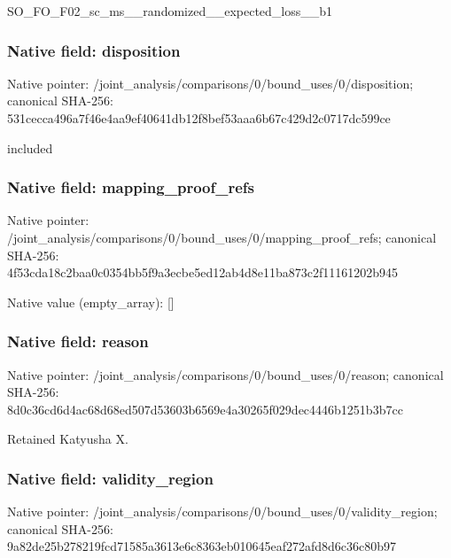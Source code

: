 \documentclass[10pt,a4paper]{article}
\begin{document}
\begingroup\raggedright\sloppy SO\_\allowbreak{}FO\_\allowbreak{}F02\_\allowbreak{}sc\_\allowbreak{}ms\_\allowbreak{}\_\allowbreak{}randomized\_\allowbreak{}\_\allowbreak{}expected\_\allowbreak{}loss\_\allowbreak{}\_\allowbreak{}b1\par\endgroup

\subsubsection{Native field: disposition}
Native pointer: /joint\_\allowbreak{}analysis/comparisons/0/bound\_\allowbreak{}uses/0/disposition; canonical SHA-256: 531cecca496a7f46e4aa9ef40641db12f8bef53aaa6b67c429d2c0717dc599ce

\begingroup\raggedright\sloppy included\par\endgroup

\subsubsection{Native field: mapping\_\allowbreak{}proof\_\allowbreak{}refs}
Native pointer: /joint\_\allowbreak{}analysis/comparisons/0/bound\_\allowbreak{}uses/0/mapping\_\allowbreak{}proof\_\allowbreak{}refs; canonical SHA-256: 4f53cda18c2baa0c0354bb5f9a3ecbe5ed12ab4d8e11ba873c2f11161202b945

Native value (empty\_\allowbreak{}array): []

\subsubsection{Native field: reason}
Native pointer: /joint\_\allowbreak{}analysis/comparisons/0/bound\_\allowbreak{}uses/0/reason; canonical SHA-256: 8d0c36cd6d4ac68d68ed507d53603b6569e4a30265f029dec4446b1251b3b7cc

\begingroup\raggedright\sloppy Retained Katyusha X.\par\endgroup

\subsubsection{Native field: validity\_\allowbreak{}region}
Native pointer: /joint\_\allowbreak{}analysis/comparisons/0/bound\_\allowbreak{}uses/0/validity\_\allowbreak{}region; canonical SHA-256: 9a82de25b278219fcd71585a3613e6c8363eb010645eaf272afd8d6c36c80b97
\end{document}
